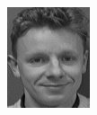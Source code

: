 \begin{frame}
\begin{columns}
\begin{overlayarea}{\textwidth}{\textheight}
      \begin{minipage}[t]{0.15\textwidth}
        \includegraphics[width=\textwidth]{images/celebrity_images/s21_1.jpg}
      \end{minipage}
      \begin{minipage}[t]{0.15\textwidth}

\end{minipage}
\end{overlayarea}
\end{columns}
\end{frame}
